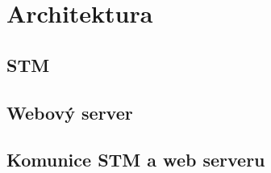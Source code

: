 \chapter{Architektura}

\section{STM}








\section{Webový server}


\section{Komunice STM a web serveru}

